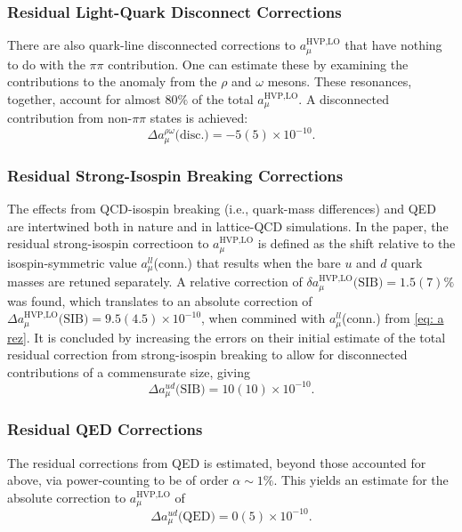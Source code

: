 \documentclass[
a4paper,
10pt,
twoside,
prd,
aps,
nofootinbib,
superscriptaddress,
floatfix,
preprintnumbers,
]{article}
\begin{document}
\subsubsection{Residual Light-Quark Disconnect Corrections}

There are also quark-line disconnected corrections to $a_\mu^{\text{HVP,LO}}$ that have nothing to do with the $\pi\pi$ contribution.
One can estimate these by examining the contributions to the anomaly from the $\rho$ and $\omega$ mesons.
These resonances, together, account for almost $80\%$ of the total $a_\mu^{\text{HVP,LO}}$.
A disconnected contribution from non-$\pi\pi$ states is achieved:
\begin{equation}
	\Delta a_\mu^{\rho\omega} \text{(disc.)} = -5(5)\times 10^{-10}.
	\label{eq: rhoomega}
\end{equation}

\subsubsection{Residual Strong-Isospin Breaking Corrections}

The effects from QCD-isospin breaking (i.e., quark-mass differences) and QED are intertwined both in nature and in lattice-QCD simulations.
In the paper, the residual strong-isospin correctioon to $a_\mu^{\text{HVP,LO}}$ is defined as the shift relative to the isospin-symmetric value $a_\mu^{ll}$(conn.) that results when the bare $u$ and $d$ quark masses are retuned separately.
A relative correction of $\delta a_\mu^{\text{HVP,LO}}\text{(SIB)} = 1.5(7)\%$ was found, which translates to an absolute correction of $\Delta a_\mu^{\text{HVP,LO}}\text{(SIB)}=9.5(4.5) \times 10^{-10}$, when commined with $a_\mu^{ll}$(conn.) from \ref{eq: a rez}.
It is concluded by increasing the errors on their initial estimate of the total residual correction from strong-isospin breaking to allow for disconnected contributions of a commensurate size, giving
\begin{equation}
	\Delta a_\mu^{ud} \text{(SIB)} = 10(10) \times 10^{-10}.
	\label{eq: ud SIB}
\end{equation}


\subsubsection{Residual QED Corrections}
The residual corrections from QED is estimated, beyond those accounted for above, via power-counting to be of order $α \sim 1\%$.
This yields an estimate for the absolute correction to $a_\mu^{\text{HVP,LO}}$ of
\begin{equation}
	\Delta a_\mu^{ud}\text{(QED)} = 0(5) \times 10^{-10}.
	\label{eq: ud QED}
\end{equation}
\end{document}
